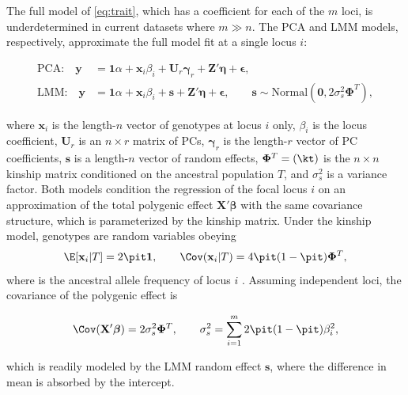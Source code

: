 \documentclass[11pt]{article}
\begin{document}
\begin{linenumbers}
The full model of \cref{eq:trait}, which has a coefficient for each of the $m$ loci, is underdetermined in current datasets where $m \gg n$.
The PCA and LMM models, respectively, approximate the full model fit at a single locus $i$:
\begin{linenomath*}
\begin{align}
  \label{eq:pca_gwas}
  \text{PCA:}\quad
  \mathbf{y}
  &=
    \mathbf{1} \alpha + \mathbf{x}_i \beta_i + \mathbf{U}_r \boldsymbol{\gamma}_r + \mathbf{Z}' \boldsymbol{\eta} + \boldsymbol{\epsilon}
    , \\
  \label{eq:lmm_gwas}
  \text{LMM:}\quad
  \mathbf{y}
  &=
    \mathbf{1} \alpha + \mathbf{x}_i \beta_i + \mathbf{s} + \mathbf{Z}' \boldsymbol{\eta} + \boldsymbol{\epsilon}
    ,
    \quad\quad
    \mathbf{s} \sim \text{Normal} \left( \mathbf{0}, 2 \sigma^2_s \mathbf{\Phi}^T \right),
\end{align}
\end{linenomath*}
where $\mathbf{x}_i$ is the length-$n$ vector of genotypes at locus $i$ only,
$\beta_i$ is the locus coefficient,
$\mathbf{U}_r$ is an $n \times r$ matrix of PCs,
$\boldsymbol{\gamma}_r$ is the length-$r$ vector of PC coefficients,
$\mathbf{s}$ is a length-$n$ vector of random effects,
$\mathbf{\Phi}^T = (\kt)$ is the $n \times n$ kinship matrix conditioned on the ancestral population $T$,
and $\sigma^2_s$ is a variance factor.
Both models condition the regression of the focal locus $i$ on an approximation of the total polygenic effect $\mathbf{X}' \boldsymbol{\beta}$ with the same covariance structure, which is parameterized by the kinship matrix.
Under the kinship model, genotypes are random variables obeying
\begin{equation}
  \label{eq:kinship_model}
  \E[ \mathbf{x}_i | T ]
  =
  2 \pit \mathbf{1},
  \quad\quad
  \Cov( \mathbf{x}_i | T )
  =
  4 \pit ( 1 - \pit ) \mathbf{\Phi}^T,
\end{equation}
where \pit is the ancestral allele frequency of locus $i$ \citep{malecot_mathematiques_1948, wright_genetical_1949, jacquard_structures_1970, astle_population_2009}.
Assuming independent loci, the covariance of the polygenic effect is
\begin{linenomath*}
$$
\Cov( \mathbf{X}' \boldsymbol{\beta} ) = 2 \sigma^2_s \mathbf{\Phi}^T,
\quad\quad
\sigma^2_s = \sum_{i=1}^m 2 \pit ( 1 - \pit ) \beta_i^2,
$$
\end{linenomath*}
which is readily modeled by the LMM random effect $\mathbf{s}$, where the difference in mean is absorbed by the intercept.

\end{linenumbers}
\end{document}
